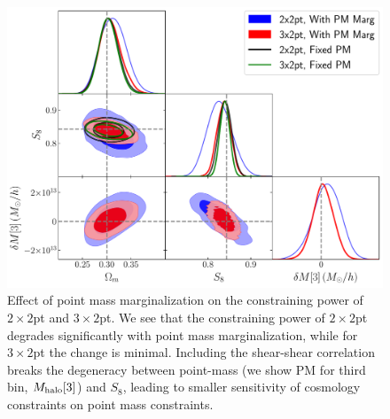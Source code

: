 \documentclass[aps, prd,twocolumn,superscriptaddress,nofootinbib,preprintnumbers]{revtex4-1}
\newcommand{\gammat}{\ensuremath{\gamma_{\rm t}(\theta)}}
\begin{document}

\begin{figure}
\includegraphics[width=\columnwidth]{figs/PM_constraints_2x2pt_3x2pt.pdf}
\caption[]{Effect of point mass marginalization on the constraining power of $2\times2$pt and $3\times2$pt. We see that the constraining power of $2\times2$pt degrades significantly with point mass marginalization, while for $3\times2$pt the change is minimal. Including the shear-shear correlation  breaks the degeneracy between point-mass (we show PM for third bin, $M_{\rm halo}[3]$) and $S_8$, leading to smaller sensitivity of cosmology constraints on point mass constraints. }
\label{fig:pm_effect}
\end{figure}
\end{document}
